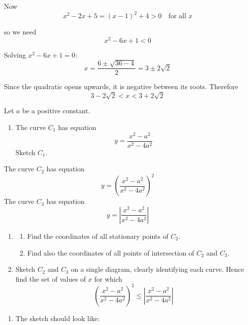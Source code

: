 \documentclass[leqno]{article}
\begin{document}
\begin{enumerate}[
  label=\textbf{\arabic*.},
  leftmargin=*,
  topsep=0pt,
  partopsep=0pt,
  parsep=0pt
]
\begin{djsSolution}
\begin{enumerate}[label=\textbf{(\alph*)}]
{  Now
  \[
  x^2-2x+5=(x-1)^2+4>0 \quad \text{for all }x
  \]

  so we need
  \[
  x^2-6x+1<0
  \]

  Solving \(x^2-6x+1=0\):
  \[
  x=\frac{6\pm\sqrt{36-4}}{2}=3\pm2\sqrt2
  \]

  Since the quadratic opens upwards, it is negative between its roots. Therefore
  \[
  3-2\sqrt2<x<3+2\sqrt2
  \]

\par}
\end{enumerate}
\end{djsSolution}


\newpage

\questionitem

Let $a$ be a positive constant. \\
\begin{enumerate}[label=\textbf{(\alph*)}]
  \item The curve $C_1$ has equation
  \[
  y=\frac{x^2-a^2}{x^2-4a^2}
  \]
  Sketch $C_1$.  \\
  \end{enumerate}
  The curve $C_2$ has equation
  \[
  y=\left(\frac{x^2-a^2}{x^2-4a^2}\right)^2
  \]
  The curve $C_3$ has equation
  \[
  y=\left|\frac{x^2-a^2}{x^2-4a^2}\right|
  \]
  \begin{enumerate}[label=\textbf{(\alph*)}, resume]
  \item
  \begin{enumerate}[label=(\roman*)]
    \item Find the coordinates of all stationary points of $C_2$. 
    \item Find also the coordinates of all points of intersection of $C_2$ and $C_3$.  \\
  \end{enumerate}
  \item Sketch $C_2$ and $C_3$ on a single diagram, clearly identifying each curve. Hence find the set of values of $x$ for which
  \[
  \left(\frac{x^2-a^2}{x^2-4a^2}\right)^2 \leq \left|\frac{x^2-a^2}{x^2-4a^2}\right|
  \]
\end{enumerate}

\vspace*{10pt}

\begin{djsSolution}
\begin{enumerate}[label=\textbf{(\alph*)}]
  \item The sketch should look like:\par\nopagebreak
  

\end{enumerate}
\end{djsSolution}
\end{enumerate}
\end{document}
